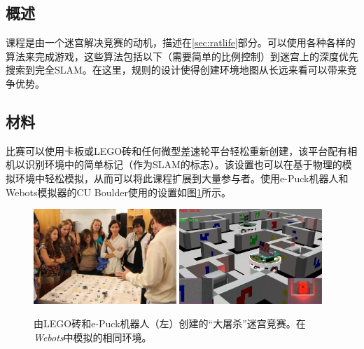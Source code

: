 \subsection{概述}
课程是由一个迷宫解决竞赛的动机，描述在\ref{sec:ratlife}部分。可以使用各种各样的算法来完成游戏，这些算法包括以下（需要简单的比例控制）到迷宫上的深度优先搜索到完全SLAM。在这里，规则的设计使得创建环境地图从长远来看可以带来竞争优势。


\subsection{材料}
比赛可以使用卡板或LEGO砖和任何微型差速轮平台轻松重新创建，该平台配有相机以识别环境中的简单标记（作为SLAM的标志）。该设置也可以在基于物理的模拟环境中轻松模拟，从而可以将此课程扩展到大量参与者。使用e-Puck机器人和Webots模拟器的CU Boulder使用的设置如图\ref{fig:ratslifereal}所示。

\begin{figure}[!htb]
\includegraphics[width=0.48\textwidth]{figs/ratslife_real}
\includegraphics[width=0.48\textwidth]{figs/ratslife_webots}
\caption{由LEGO砖和e-Puck机器人（左）创建的“大屠杀”迷宫竞赛。在\emph{Webots}中模拟的相同环境。}
\label{fig:ratslifereal}
\end{figure}

